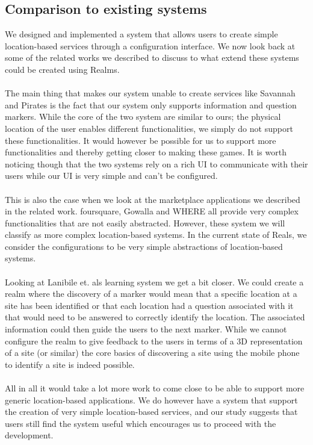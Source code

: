 \subsection{Comparison to existing systems} %
\label{sub:comparison_to_existing_systems}
We designed and implemented a system that allows users to create simple location-based services through a configuration interface. We now look back at some of the related works we described to discuss to what extend these systems could be created using Realms.
\\\\
The main thing that makes our system unable to create services like Savannah \cite{Benford_Rowland_Hull_Reid_Morrison_Facer_Clayton_2004} and Pirates \cite{Falk:2001:PPI:634067.634140} is the fact that our system only supports information and question markers. While the core of the two system are similar to ours; the physical location of the user enables different functionalities, we simply do not support these functionalities. It would however be possible for us to support more functionalities and thereby getting closer to making these games. It is worth noticing though that the two systems rely on a rich UI to communicate with their users while our UI is very simple and can't be configured.
\\\\
This is also the case when we look at the marketplace applications we described in the related work. foursquare, Gowalla and WHERE all provide very complex functionalities that are not easily abstracted. However, these system we will classify as more complex location-based systems. In the current state of Reals, we consider the configurations to be very simple abstractions of location-based systems. 
\\\\
Looking at Lanibile et. als learning system \cite{4351331} we get a bit closer. We could create a realm where the discovery of a marker would mean that a specific location at a site has been identified or that each location had a question associated with it that would need to be answered to correctly identify the location. The associated information could then guide the users to the next marker. While we cannot configure the realm to give feedback to the users in terms of a 3D representation of a site (or similar) the core basics of discovering a site using the mobile phone to identify a site is indeed possible.
\\\\
All in all it would take a lot more work to come close to be able to support more generic location-based applications. We do however have a system that support the creation of very simple location-based services, and our study suggests that users still find the system useful which encourages us to proceed with the development.
